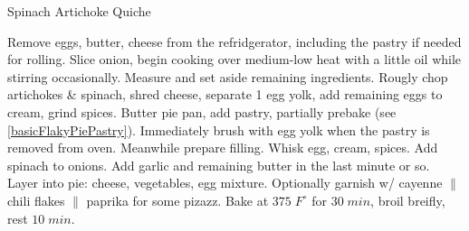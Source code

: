 \begin{recipe}[
preparationtime = 1 hour,
source = \citefield{joyofcooking2006}{title} \cite{joyofcooking2006},
]
{Spinach Artichoke Quiche}


\preparation
{
\step Remove eggs, butter, cheese from the refridgerator, including the pastry if needed for rolling.
\step Slice onion, begin cooking over medium-low heat with a little oil while stirring occasionally.
\step Measure and set aside remaining ingredients. Rougly chop artichokes \& spinach, shred cheese, separate 1 egg yolk, add remaining eggs to cream, grind spices.
\step Butter pie pan, add pastry, partially prebake (see \ref{basicFlakyPiePastry}). Immediately brush with egg yolk when the pastry is removed from oven.
\step Meanwhile prepare filling. Whisk egg, cream, spices. Add spinach to onions. Add garlic and remaining butter in the last minute or so.
\step Layer into pie: cheese, vegetables, egg mixture. Optionally garnish w/ cayenne $\|$ chili flakes $\|$ paprika for some pizazz.
\step Bake at $375\; F^\circ$ for $30\; min$, broil breifly, rest $10\; min$.
}


\end{recipe}
